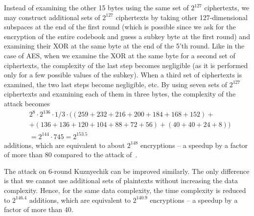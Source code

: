 Instead of examining the other 15 bytes using the same set of $2^{127}$ ciphertexts, we may construct additional sets of $2^{127}$ ciphertexts by taking other 127-dimensional subspaces at the end of the first round (which is possible since we ask for the encryption of the entire codebook and guess a subkey byte at the first round) and examining their XOR at the same byte at the end of the 5'th round. Like in the case of AES, when we examine the XOR at the same byte for a second set of ciphertexts, the complexity of the last step becomes negligible (as it is performed only for a few possible values of the subkey). When a third set of ciphertexts is examined, the two last steps become negligible, etc. By using seven sets of $2^{127}$ ciphertexts and examining each of them in three bytes, the complexity of the attack becomes 
\begin{align*}
    &2^8 \cdot 2^{136} \cdot 1/3 \cdot \big((259+232+216+200+184+168+152)+\\&+(136+136+120+104+88+72+56)+
(40+40+24+8)\big)\\&=2^{144}\cdot 745=2^{153.5}
\end{align*} 
additions, which are equivalent to about $2^{148}$ encryptions -- a speedup by a factor of more than 80 compared to the attack of~\cite{TOSC:BirKhoPer16}.

The attack on 6-round Kuznyechik can be improved similarly. The only difference is that we cannot use additional sets of plaintexts without increasing the data complexity. Hence, for the same data complexity, the time complexity is reduced to $2^{146.4}$ additions, which are equivalent to $2^{140.9}$ encryptions -- a speedup by a factor of more than 40.

